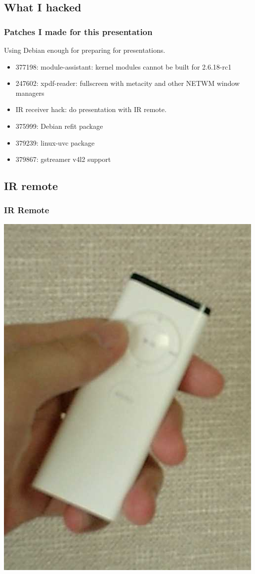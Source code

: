 \documentclass[cjk,dvipdfm]{beamer}
\begin{document}
\subsection{What I hacked}

\begin{frame}
 \frametitle{Patches I made for this presentation}

Using Debian enough for preparing for presentations.

 \begin{itemize}[<+->]
  \item 377198: module-assistant: kernel modules cannot be built for 2.6.18-rc1
  \item 247602: xpdf-reader: fullscreen with metacity and other NETWM
	window managers
  \item IR receiver hack: do presentation with IR remote.
  \item 375999: Debian refit package
  \item 379239: linux-uvc package
  \item 379867: gstreamer v4l2 support
 \end{itemize}
\end{frame}

\subsection{IR remote}
\begin{frame}
 \frametitle{IR Remote}
\includegraphics[width=0.4\hsize]{image200607/remote.png}
\end{frame}
\end{document}

